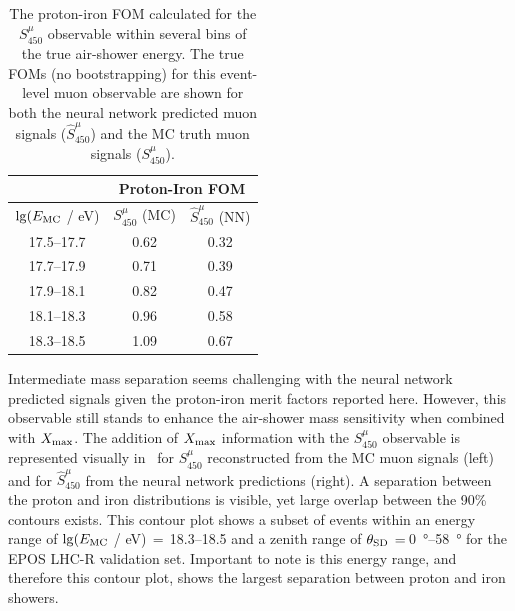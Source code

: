\begin{table}
    \caption[FOM values of the reference distance muon signals.]{The proton-iron FOM calculated for the $S^{\mu}_{450}$ observable within several bins of the true air-shower energy. The true FOMs (no bootstrapping) for this event-level muon observable are shown for both the neural network predicted muon signals ($\hat{S}^{\mu}_{450}$) and the MC truth muon signals ($S^{\mu}_{450}$).}
    \label{tab:smu450_foms}
    \vspace*{.5\baselineskip}
    \centering
    \begin{tabular}{| c || c | c |}
        \hline
                   & \multicolumn{2}{c|}{Proton-Iron FOM}\\
        \hline
        $\lg(E_{\rm MC}$ / eV)  & $S^{\mu}_{450}$ (MC)   & $\hat{S}^{\mu}_{450}$ (NN)\\
        \hline
        \hline
        \numrange{17.5}{17.7}   & 0.62                   & 0.32\\
        \numrange{17.7}{17.9}   & 0.71                   & 0.39\\
        \numrange{17.9}{18.1}   & 0.82                   & 0.47\\
        \numrange{18.1}{18.3}   & 0.96                   & 0.58\\
        \numrange{18.3}{18.5}   & 1.09                   & 0.67\\
        \hline
    \end{tabular}
\end{table}

Intermediate mass separation seems challenging with the neural network predicted signals given the proton-iron merit factors reported here.
However, this observable still stands to enhance the air-shower mass sensitivity when combined with $X_{\rm max}$.
The addition of $X_{\rm max}$ information with the $S^{\mu}_{450}$ observable is represented visually in~ for $S^{\mu}_{450}$ reconstructed from the MC muon signals (left) and for $\hat{S}^{\mu}_{450}$ from the neural network predictions (right).
A separation between the proton and iron distributions is visible, yet large overlap between the 90\% contours exists.
This contour plot shows a subset of events within an energy range of $\lg(E_{\rm MC}$ / eV)$\,=\,$\numrange{18.3}{18.5} and a zenith range of $\theta_{\rm SD}\,=\,$\qtyrange{0}{58}{\degree} for the EPOS LHC-R validation set.
Important to note is this energy range, and therefore this contour plot, shows the largest separation between proton and iron showers.

